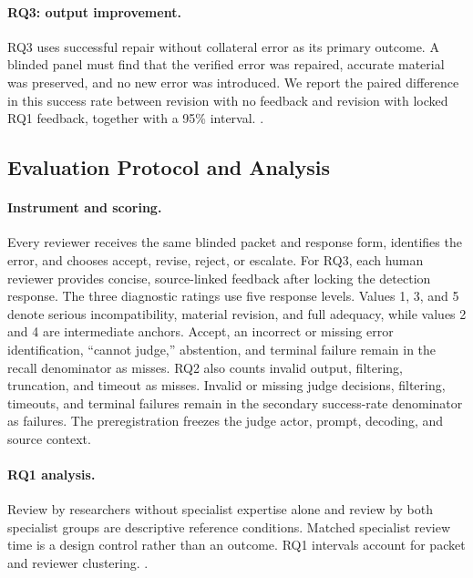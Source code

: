 \paragraph{RQ3: output improvement.}
RQ3 uses successful repair without collateral error as its primary outcome. A blinded panel must find that the verified error was repaired, accurate material was preserved, and no new error was introduced. We report the paired difference in this success rate between revision with no feedback and revision with locked RQ1 feedback, together with a 95\% interval. .

\subsection{Evaluation Protocol and Analysis}
\label{sec:evaluation_analysis}

\paragraph{Instrument and scoring.}
Every reviewer receives the same blinded packet and response form, identifies the error, and chooses accept, revise, reject, or escalate. For RQ3, each human reviewer provides concise, source-linked feedback after locking the detection response. The three diagnostic ratings use five response levels. Values 1, 3, and 5 denote serious incompatibility, material revision, and full adequacy, while values 2 and 4 are intermediate anchors. Accept, an incorrect or missing error identification, ``cannot judge,'' abstention, and terminal failure remain in the recall denominator as misses. RQ2 also counts invalid output, filtering, truncation, and timeout as misses. Invalid or missing judge decisions, filtering, timeouts, and terminal failures remain in the secondary success-rate denominator as failures. The preregistration freezes the judge actor, prompt, decoding, and source context.

\paragraph{RQ1 analysis.}
Review by researchers without specialist expertise alone and review by both specialist groups are descriptive reference conditions. Matched specialist review time is a design control rather than an outcome. RQ1 intervals account for packet and reviewer clustering. .

